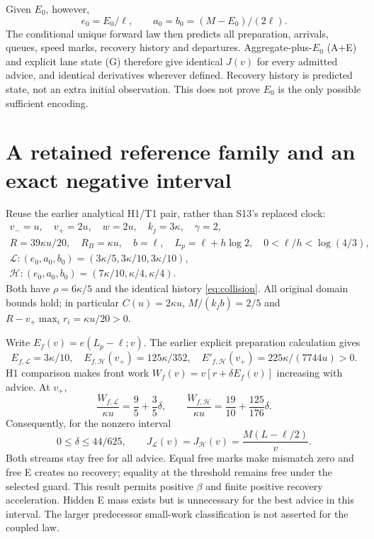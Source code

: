\documentclass[11pt,a4paper]{article}
\begin{document}
Given $E_0$, however,
\begin{equation}
 e_0=E_0/\ell,\qquad a_0=b_0=(M-E_0)/(2\ell).
 \label{eq:reconstruct}
\end{equation}
The conditional unique forward law then predicts all preparation, arrivals,
queues, speed marks, recovery history and departures. Aggregate-plus-$E_0$
(A+E) and explicit lane state (G) therefore give identical $J(v)$ for every
admitted advice, and identical derivatives wherever defined. Recovery
history is predicted state, not an extra initial observation. This does
not prove $E_0$ is the only possible sufficient encoding.

\section{A retained reference family and an exact negative interval}
Reuse the earlier analytical H1/T1 pair, rather than S13's replaced clock:
\begin{equation}
\begin{gathered}
v_-=u,\quad v_+=2u,\quad w=2u,\quad k_j=3\kappa,\quad\gamma=2,\\
R=39\kappa u/20,\quad R_B=\kappa u,\quad b=\ell,\quad
L_p=\ell+h\log2,\quad 0<\ell/h<\log(4/3),\\
\mathcal L:(e_0,a_0,b_0)=(3\kappa/5,3\kappa/10,3\kappa/10),\\
\mathcal H:(e_0,a_0,b_0)=(7\kappa/10,\kappa/4,\kappa/4).
\end{gathered}
\label{eq:family}
\end{equation}
Both have $\rho=6\kappa/5$ and the identical history
\eqref{eq:collision}. All original domain bounds hold; in particular
$C(u)=2\kappa u$, $M/(k_jb)=2/5$ and
$R-v_+\max_i r_i=\kappa u/20>0$.

Write $E_f(v)=e(L_p-\ell;v)$. The earlier explicit preparation calculation
gives
\begin{equation}
 E_{f,\mathcal L}=3\kappa/10,\quad
 E_{f,\mathcal H}(v_+)=125\kappa/352,\quad
 E'_{f,\mathcal H}(v_+)=225\kappa/(7744u)>0.
 \label{eq:front}
\end{equation}
H1 comparison makes front work
$W_f(v)=v[r+\delta E_f(v)]$ increasing with advice. At $v_+$,
\begin{equation}
 \frac{W_{f,\mathcal L}}{\kappa u}=\frac95+\frac35\delta,
 \qquad
 \frac{W_{f,\mathcal H}}{\kappa u}=\frac{19}{10}+\frac{125}{176}\delta.
 \label{eq:frontwork}
\end{equation}
Consequently, for the nonzero interval
\begin{equation}
 0\leq\delta\leq44/625,
 \qquad J_{\mathcal L}(v)=J_{\mathcal H}(v)
 =\frac{M(L-\ell/2)}v.
 \label{eq:negative}
\end{equation}
Both streams stay free for all advice. Equal free marks make mismatch
zero and free E creates no recovery; equality at the threshold remains
free under the selected guard. This result permits positive $\beta$ and
finite positive recovery acceleration. Hidden E mass exists but is
unnecessary for the best advice in this interval. The larger predecessor
small-work classification is not asserted for the coupled law.
\end{document}
